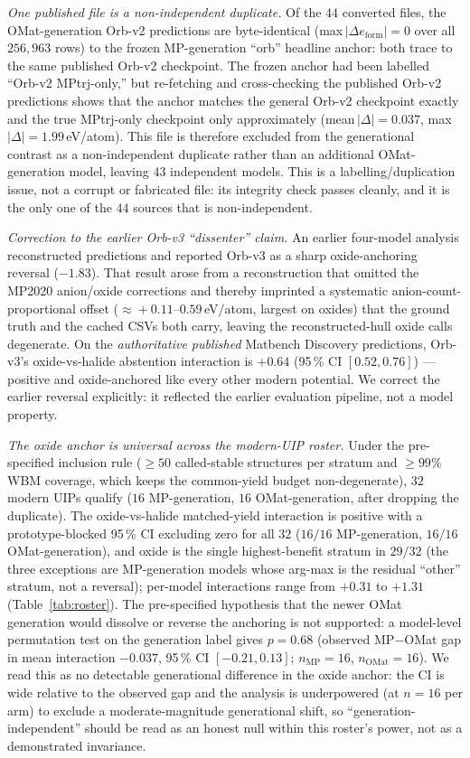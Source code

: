 \documentclass[11pt]{article}
\begin{document}
\emph{One published file is a non-independent duplicate.} Of the $44$ converted files, the
OMat-generation Orb-v2 predictions are byte-identical
(max\,$|\Delta e_{\mathrm{form}}| = 0$ over all $256{,}963$ rows) to the frozen
\textsc{MP}-generation ``orb'' headline anchor: both trace to the same published Orb-v2
checkpoint. The frozen anchor had been labelled ``Orb-v2 MPtrj-only,'' but re-fetching and
cross-checking the published Orb-v2 predictions shows that the anchor matches the general Orb-v2
checkpoint exactly and the true MPtrj-only checkpoint only approximately
(mean\,$|\Delta| = 0.037$, max\,$|\Delta| = 1.99$\,eV/atom). This file is therefore excluded from the
generational contrast as a non-independent duplicate rather than an additional OMat-generation
model, leaving $43$ independent models. This is a labelling/duplication issue, not a corrupt or
fabricated file: its integrity check passes cleanly, and it is the only one of the $44$ sources that is
non-independent.

\emph{Correction to the earlier Orb-v3 ``dissenter'' claim.} An earlier four-model analysis
reconstructed predictions and reported Orb-v3 as a sharp oxide-anchoring
reversal ($-1.83$). That result arose from a reconstruction that omitted
the MP2020 anion/oxide corrections and thereby imprinted a systematic anion-count-proportional
offset ($\approx\!+0.11$--$0.59$\,eV/atom, largest on oxides) that the ground truth and the cached
CSVs both carry, leaving the reconstructed-hull oxide calls degenerate. On the \emph{authoritative
published} Matbench Discovery predictions, Orb-v3's oxide-vs-halide abstention interaction is $+0.64$
(95\,\% CI $[0.52, 0.76]$) --- positive and oxide-anchored like every other modern potential. We
correct the earlier reversal explicitly: it reflected the earlier evaluation pipeline, not a model property.

\emph{The oxide anchor is universal across the modern-UIP roster.} Under the pre-specified
inclusion rule ($\ge\!50$ called-stable structures per stratum and $\ge\!99\%$ WBM coverage, which
keeps the common-yield budget non-degenerate), $32$ modern UIPs qualify ($16$ MP-generation, $16$
OMat-generation, after dropping the duplicate). The oxide-vs-halide matched-yield interaction is
positive with a prototype-blocked 95\,\% CI excluding zero for all $32$ ($16/16$
MP-generation, $16/16$ OMat-generation), and oxide is the single highest-benefit stratum in
$29/32$ (the three exceptions are MP-generation models whose arg-max is the residual ``other''
stratum, not a reversal); per-model interactions range from $+0.31$ to $+1.31$
(Table~\ref{tab:roster}). The pre-specified hypothesis that the newer OMat generation would
dissolve or reverse the anchoring is not supported: a model-level permutation test on the
generation label gives $p = 0.68$ (observed MP$-$OMat gap in mean interaction $-0.037$, 95\,\% CI
$[-0.21, 0.13]$; $n_{\mathrm{MP}} = 16$, $n_{\mathrm{OMat}} = 16$). We read this as no detectable
generational difference in the oxide anchor: the CI is wide relative to the observed gap and the
analysis is underpowered (at $n=16$ per arm) to exclude a moderate-magnitude generational shift,
so ``generation-independent'' should be read as an honest null within this roster's power, not as
a demonstrated invariance.
\end{document}
